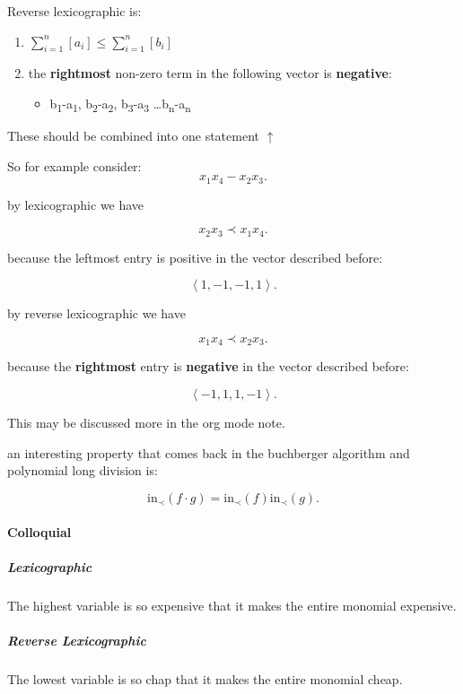 \documentclass[a4paper,11pt,twoside]{article}
\begin{document}
Reverse lexicographic is:

\begin{enumerate}
\item \(\sum^{n}_{i=1}\left[ a_i  \right] \leq \sum^{n}_{i=1}\left[ b_i  \right]\)

\item the \textbf{rightmost} non-zero term in the following vector is \textbf{negative}:

\begin{itemize}
\item b\textsubscript{1}-a\textsubscript{1}, b\textsubscript{2}-a\textsubscript{2}, b\textsubscript{3}-a\textsubscript{3} \ldots{}b\textsubscript{n}-a\textsubscript{n}
\end{itemize}
\end{enumerate}

These should be combined into one statement \(\uparrow\)

So for example consider: $$x_1x_4-x_2x_3
 .$$

by lexicographic we have

$$x_2x_3\prec x_1x_4
 .$$

because the leftmost entry is positive in the vector described before:

$$\left\langle 1, -1, -1, 1\right \rangle
 .$$

by reverse lexicographic we have

$$x_1x_4 \prec x_2x_3
 .$$

because the \textbf{rightmost} entry is \textbf{negative} in the vector described
before:

$$\left\langle -1, 1, 1, -1\right \rangle
 .$$

This may be discussed more in the org mode note.

an interesting property that comes back in the buchberger algorithm and
polynomial long division is:

$$\mathrm{in}_{\prec}\left( f \cdot g \right) = \mathrm{in}_{\prec}\left( f \right) \mathrm{in}_{\prec}\left( g \right) 
 .$$

\paragraph{Colloquial}
\label{sec:org93e3f5b}
\subparagraph{Lexicographic}
\label{sec:org3730d87}
The highest variable is so expensive that it makes the entire
monomial expensive.
\subparagraph{Reverse Lexicographic}
\label{sec:org6c77df3}
The lowest variable is so chap that it makes the entire monomial cheap.
\end{document}
